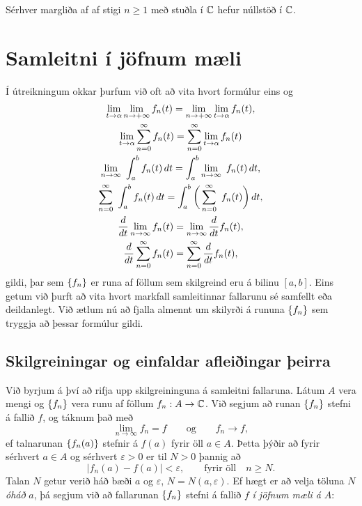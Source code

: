 \begin{se}
Sérhver margliða af af stigi $n\geq 1$ með stuðla í ${\mathbb C}$ hefur núllstöð í ${\mathbb C}$.  
\end{se}



\section{Samleitni í jöfnum mæli}


Í útreikningum okkar  þurfum við oft að  vita
hvort formúlur eins og  
\begin{gather*}
\lim_{t\to \alpha}\lim_{n\to+\infty}f_n(t)=
\lim_{n\to+\infty}\lim_{t\to \alpha}f_n(t),\\
\lim_{t\to \alpha}\sum_{n=0}^\infty f_n(t)=\sum_{n=0}^\infty
\lim_{t\to \alpha}f_n(t)\\
\lim_{n\to\infty}\ \int_a \sp b f_n(t)  \, dt=
\int_a \sp b \lim_{n\to\infty}\
f_n(t) \, dt,\\
\sum_{n=0}^{\infty}\ \int_a \sp b f_n(t)  \, dt=
\int_a \sp b \bigg(\sum_{n=0}^{\infty}\
f_n(t)\bigg) \, dt,\\
\dfrac d{dt} \lim_{n\to \infty} f_n(t) =\lim_{n\to\infty}
\dfrac d{dt} f_n(t),\\
\dfrac d{dt} \sum_{n=0}^{\infty} f_n(t) =\sum_{n=0}^{\infty}
\dfrac d{dt} f_n(t),
\end{gather*}
gildi, þar sem ${\{f_n\}}$  er runa af föllum sem skilgreind eru á
bilinu $[a,b]$.  Eins getum við þurft að vita hvort markfall
samleitinnar fallarunu sé samfellt eða deildanlegt.  Við ætlum nú að
fjalla almennt um skilyrði á rununa ${\{f_n\}}$ sem tryggja að þessar
formúlur gildi.

\subsection*{Skilgreiningar og einfaldar
afleiðingar þeirra}

Við byrjum á því að rifja upp skilgreininguna á samleitni fallaruna.
Látum  $A$ vera mengi og ${\{ f_n\}}$ vera runu af föllum $f_n:A\to
{\mathbb C}$. Við segjum að runan ${\{f_n\}}$ stefni á fallið $f$, og táknum
það með 
 $$\lim_{n\to\infty}f_n=f \qquad \text{og} \qquad
f_n\to f,
 $$
ef talnarunan ${\{f_n(a)\}}$ stefnir á $f(a)$ fyrir öll $a\in A$.
Þetta þýðir að fyrir sérhvert $a\in A$ og sérhvert $\varepsilon>0$ er
til $N>0$ þannig að 
 $$|f_n(a)-f(a)|<\varepsilon, \qquad \text{fyrir öll} \quad n\geq N.
 $$
Talan $N$ getur verið háð bæði $a$ og $\varepsilon$,
$N=N(a,\varepsilon)$.  Ef hægt er að velja töluna $N$ 
{\it óháð} $a$, þá segjum við að fallarunan ${\{f_n\}}$ stefni á
fallið $f$ {\it í jöfnum mæli á } $A$:

